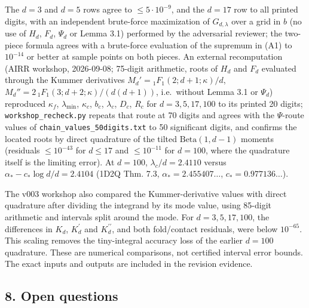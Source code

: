 \documentclass[
  11pt,
  a4paper,
]{article}
\begin{document}
The \(d=3\) and \(d=5\) rows agree to \(\le5\cdot10^{-9}\), and the
\(d=17\) row to all printed digits, with an independent brute-force
maximization of \(G_{d,\allowbreak{}\lambda}\) over a grid in \(b\) (no use of
\(H_d\), \(F_d\), \(\Psi_d\) or Lemma 3.1) performed by the adversarial
reviewer; the two-piece formula agrees with a brute-force evaluation of
the supremum in (A1) to \(10^{-14}\) or better at sample points on both
pieces. An external recomputation (AIRR workshop, 2026-09-08; 75-digit
arithmetic, roots of \(H_d\) and \(F_d\) evaluated through the Kummer
derivatives \(M_d'={}_1F_1(2;\allowbreak{}d+1;\allowbreak{}\kappa)/d\),
\(M_d''=2\,\allowbreak{}{}_1F_1(3;\allowbreak{}d+2;\allowbreak{}\kappa)/(d(d+1))\), i.e.~without Lemma 3.1 or
\(\Psi_d\)) reproduced \(\kappa_f\), \(\lambda_{\min}\), \(\kappa_c\),
\(b_c\), \(\lambda_c\), \(D_c\), \(R_c\) for \(d=3,\allowbreak{}5,\allowbreak{}17,\allowbreak{}100\) to its
printed 20 digits; {\small\texttt{workshop\_\allowbreak{}recheck.\allowbreak{}py}} repeats that route at
70 digits and agrees with the \(\Psi\)-route values of
{\small\texttt{chain\_\allowbreak{}values\_\allowbreak{}50digits.\allowbreak{}txt}} to 50 significant digits, and
confirms the located roots by direct quadrature of the tilted
\(\mathrm{Beta}(1,\allowbreak{}d-1)\) moments (residuals \(\le10^{-43}\) for
\(d\le17\) and \(\le10^{-11}\) for \(d=100\), where the quadrature
itself is the limiting error). At \(d=100\), \(\lambda_c/d=2.4110\)
versus \(\alpha_*-c_*\log d/d=2.4104\) (1D2Q Thm. 7.3,
\(\alpha_*=2.455407\ldots\), \(c_*=0.977136\ldots\)).

The v003 workshop also compared the Kummer-derivative values with direct
quadrature after dividing the integrand by its mode value, using
85-digit arithmetic and intervals split around the mode. For
\(d=3,\allowbreak{}5,\allowbreak{}17,\allowbreak{}100\), the differences in \(K_d\), \(K_d^{\prime}\) and
\(K_d^{\prime\prime}\), and both fold/contact residuals, were below
\(10^{-65}\). This scaling removes the tiny-integral accuracy loss of
the earlier \(d=100\) quadrature. These are numerical comparisons, not
certified interval error bounds. The exact inputs and outputs are
included in the revision evidence.

\subsection{8. Open questions}\label{open-questions}
\end{document}
